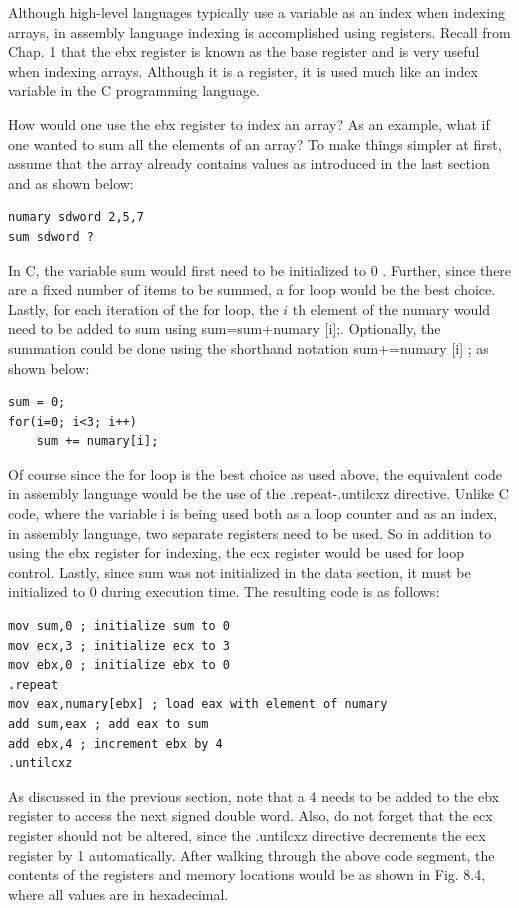 \documentclass[10pt]{article}
\begin{document}
Although high-level languages typically use a variable as an index when indexing arrays, in assembly language indexing is accomplished using registers. Recall from Chap. 1 that the ebx register is known as the base register and is very useful when indexing arrays. Although it is a register, it is used much like an index variable in the C programming language.

How would one use the ebx register to index an array? As an example, what if one wanted to sum all the elements of an array? To make things simpler at first, assume that the array already contains values as introduced in the last section and as shown below:

\begin{verbatim}
numary sdword 2,5,7
sum sdword ?
\end{verbatim}

In C, the variable sum would first need to be initialized to 0 . Further, since there are a fixed number of items to be summed, a for loop would be the best choice. Lastly, for each iteration of the for loop, the $i$ th element of the numary would need to be added to sum using sum=sum+numary [i];. Optionally, the summation could be done using the shorthand notation sum+=numary [i] ; as shown below:

\begin{verbatim}
sum = 0;
for(i=0; i<3; i++)
    sum += numary[i];
\end{verbatim}

Of course since the for loop is the best choice as used above, the equivalent code in assembly language would be the use of the .repeat-.untilcxz directive. Unlike C code, where the variable i is being used both as a loop counter and as an index, in assembly language, two separate registers need to be used. So in addition to using the ebx register for indexing, the ecx register would be used for loop control. Lastly, since sum was not initialized in the data section, it must be initialized to 0 during execution time. The resulting code is as follows:

\begin{verbatim}
mov sum,0 ; initialize sum to 0
mov ecx,3 ; initialize ecx to 3
mov ebx,0 ; initialize ebx to 0
.repeat
mov eax,numary[ebx] ; load eax with element of numary
add sum,eax ; add eax to sum
add ebx,4 ; increment ebx by 4
.untilcxz
\end{verbatim}

As discussed in the previous section, note that a 4 needs to be added to the ebx register to access the next signed double word. Also, do not forget that the ecx register should not be altered, since the .untilcxz directive decrements the ecx register by 1 automatically. After walking through the above code segment, the contents of the registers and memory locations would be as shown in Fig. 8.4, where all values are in hexadecimal.
\end{document}

